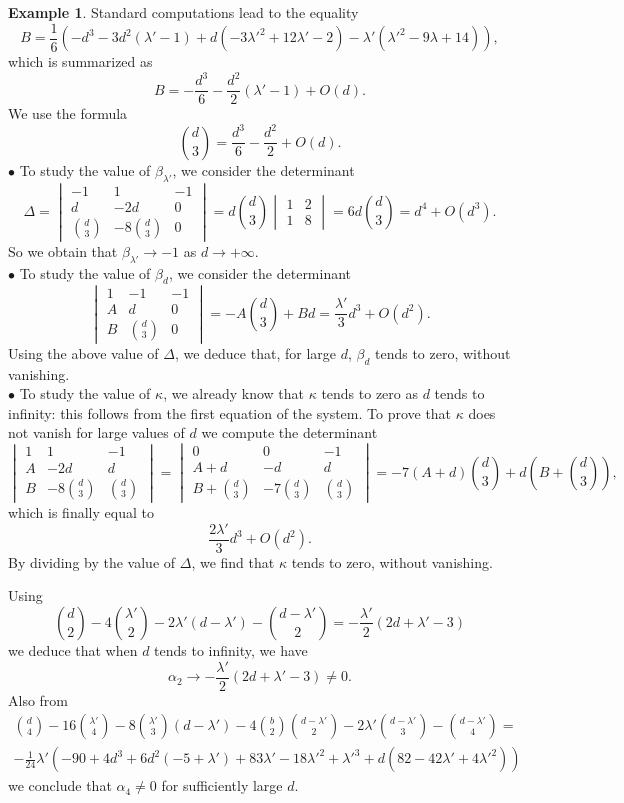 \documentclass[10pt]{article}
\theoremstyle{definition}
\newtheorem{example}[theorem]{Example}
\numberwithin{equation}{section}
\begin{document}
\begin{example}
Standard computations lead to the equality
\[
B= \frac 16 \left( -d^3-3d^2(\lambda' -1)+d (-3 \lambda'^2+12 \lambda' -2)-\lambda'(\lambda'^2 -9 \lambda +14)
\right),
\]
which is summarized as 
\[
B= - \frac {d^3} 6 -\frac {d^2}2 (\lambda'-1) +O(d).
\]
We use the formula
\[
\binom d3 = \frac{d^3}6 -\frac{d^2}2 +O(d).
\]
$\bullet$ To study the value of $\beta_{\lambda'}$, we consider the determinant
\[
\Delta=\begin{vmatrix} -1& 1 &-1\\
d &-2d& 0\\
\binom d3& -8 \binom d3 &0
\end{vmatrix} = d \binom d3 \begin{vmatrix}
1& 2\\1&8
\end{vmatrix} = 6d \binom d3= d^4 + O(d^3).
\]
So we obtain that $\beta_{\lambda'} \longrightarrow -1$ as $d\longrightarrow +\infty$.
\\
$\bullet$ To study the value of $\beta_d$, we consider the determinant 
\[
\begin{vmatrix} 1& -1 &-1\\
A &d& 0\\
B& \binom d3 &0
\end{vmatrix} = - A\binom d3 +Bd =\frac{ \lambda'}3 d^3 +O (d^2).
\]
Using the above value of $\Delta$, we deduce that, for large $d$, $\beta_d$ tends to zero, without vanishing.
\\
$\bullet$ To study the value of $\kappa$, we already know that $\kappa$ tends to zero as $d$ tends to infinity: this follows from the first equation of the system. To prove that $\kappa$ does not vanish for large values of $d$ we compute the determinant
\[
\begin{vmatrix}1 & 1 &-1 \\
A & -2d & d\\
B & -8 \binom d3 & \binom d3
\end{vmatrix} = \begin{vmatrix}
0 & 0 & -1\\
A+d & -d & d\\
B+ \binom d3 & -7 \binom d3 & \binom d3
\end{vmatrix} =-7(A+d) \binom d3 +d ( B + \binom d3), 
\]
which is finally equal to
\[
\frac {2\lambda'}3 d^3 +O(d^2).
\]
By dividing by the value of $\Delta$, we find that $\kappa$ tends to zero, without vanishing.

Using
\[
\binom d 2-4\binom{\lambda'}2 -2\lambda'(d-\lambda')-\binom {d-\lambda'}2=-\frac {\lambda'}2 (2d+\lambda'-3)
\]
we deduce that when $d$ tends to infinity, we have 
\[
\alpha_2\to -\frac {\lambda'}2 (2d+\lambda'-3)\not=0.
\]
Also from 
\[
\begin{gathered}
\binom d 4-16\binom {\lambda'}4-8\binom {\lambda'}3(d-\lambda')-4\binom b 2 \binom {d-\lambda'}2-2\lambda'\binom {d-\lambda'}3 -\binom {d-\lambda'}4 =
\\
-\frac 1{24} \lambda' (-90 + 4 d^3 + 6 d^2 (-5 + \lambda') + 83 \lambda' - 18 \lambda'^2 + \lambda'^3 + d (82 - 42 \lambda' + 4 \lambda'^2))
\end{gathered}
\]
we conclude that $\alpha_4\not=0$ for sufficiently large $d$.



\end{example}
\end{document}
